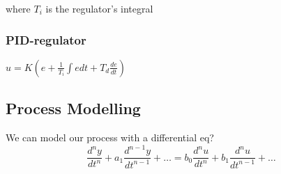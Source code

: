 \documentclass[]{article}
\theoremstyle{definition}
\begin{document}
	where $T_i$ is the regulator's integral

	\subsubsection{PID-regulator}
	$u = K(e + \frac{1}{T_i} \int edt + T_d \frac{de}{dt})$


	

	\subsection{Process Modelling}
	We can model our process with a differential eq?
	\begin{equation}
		\frac{d^ny}{dt^n} + a_1 \frac{d^{n-1}y}{dt^{n-1}} + \dots = b_0 \frac{d^nu}{dt^n} + b_1 \frac{d^nu}{dt^{n-1}} + \dots
	\end{equation}
\end{document}

